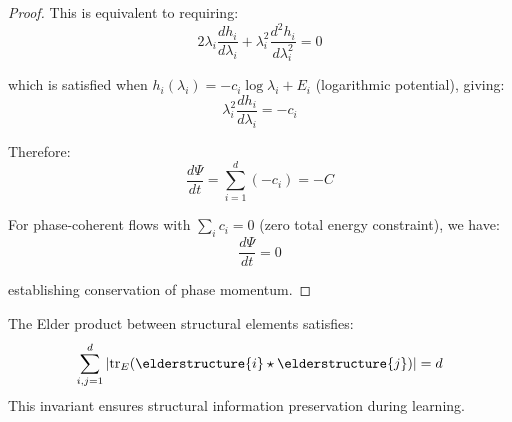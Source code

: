 \begin{proof}
This is equivalent to requiring:
$$2\lambda_i \frac{dh_i}{d\lambda_i} + \lambda_i^2 \frac{d^2h_i}{d\lambda_i^2} = 0$$

which is satisfied when $h_i(\lambda_i) = -c_i \log \lambda_i + E_i$ (logarithmic potential), giving:
$$\lambda_i^2 \frac{dh_i}{d\lambda_i} = -c_i$$

Therefore:
$$\frac{d\Psi}{dt} = \sum_{i=1}^{d} (-c_i) = -C$$

For phase-coherent flows with $\sum_i c_i = 0$ (zero total energy constraint), we have:
$$\frac{d\Psi}{dt} = 0$$

establishing conservation of phase momentum.
\end{proof}

\begin{theorem}
\label{thm:structural_conservation}
The Elder product between structural elements satisfies:
\begin{equation}
\sum_{i,j=1}^{d} |\mathrm{tr}_E(\elderstructure{i} \star \elderstructure{j})| = d
\end{equation}
This invariant ensures structural information preservation during learning.
\end{theorem}

